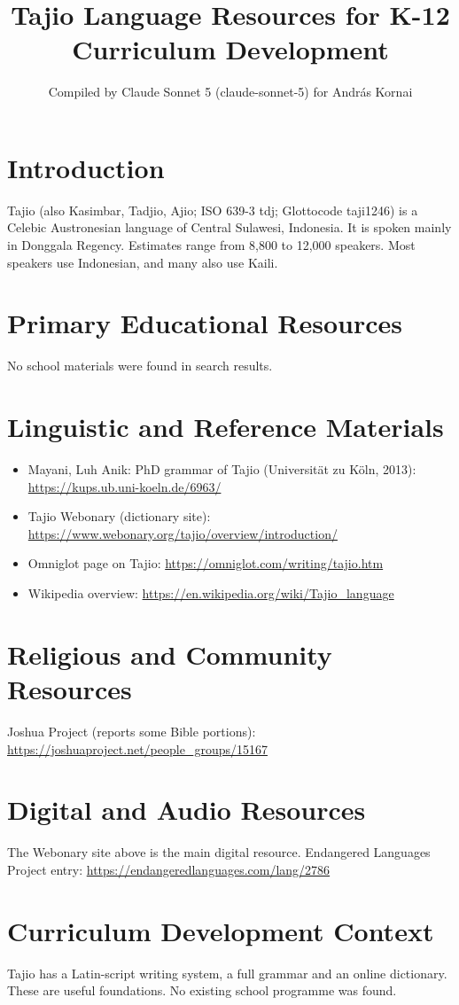 \documentclass[12pt]{article}
\title{Tajio Language Resources for K-12 Curriculum Development}
\author{Compiled by Claude Sonnet 5 (claude-sonnet-5) for Andr\'as Kornai}
\date{}
\begin{document}
\maketitle
\section{Introduction}
Tajio (also Kasimbar, Tadjio, Ajio; ISO 639-3 tdj; Glottocode taji1246) is a Celebic Austronesian language of Central Sulawesi, Indonesia. It is spoken mainly in Donggala Regency. Estimates range from 8,800 to 12,000 speakers. Most speakers use Indonesian, and many also use Kaili.
\section{Primary Educational Resources}
No school materials were found in search results.
\section{Linguistic and Reference Materials}
\begin{itemize}
\item Mayani, Luh Anik: PhD grammar of Tajio (Universit\"at zu K\"oln, 2013): \url{https://kups.ub.uni-koeln.de/6963/}
\item Tajio Webonary (dictionary site): \url{https://www.webonary.org/tajio/overview/introduction/}
\item Omniglot page on Tajio: \url{https://omniglot.com/writing/tajio.htm}
\item Wikipedia overview: \url{https://en.wikipedia.org/wiki/Tajio_language}
\end{itemize}
\section{Religious and Community Resources}
Joshua Project (reports some Bible portions): \url{https://joshuaproject.net/people_groups/15167}
\section{Digital and Audio Resources}
The Webonary site above is the main digital resource. Endangered Languages Project entry: \url{https://endangeredlanguages.com/lang/2786}
\section{Curriculum Development Context}
Tajio has a Latin-script writing system, a full grammar and an online dictionary. These are useful foundations. No existing school programme was found.
\end{document}
